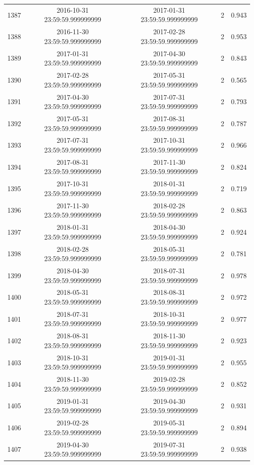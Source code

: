 \begin{table}
\begin{tabular}{lcccc}
1387 & 2016-10-31 23:59:59.999999999 & 2017-01-31 23:59:59.999999999 & 2 & 0.943 \\
1388 & 2016-11-30 23:59:59.999999999 & 2017-02-28 23:59:59.999999999 & 2 & 0.953 \\
1389 & 2017-01-31 23:59:59.999999999 & 2017-04-30 23:59:59.999999999 & 2 & 0.843 \\
1390 & 2017-02-28 23:59:59.999999999 & 2017-05-31 23:59:59.999999999 & 2 & 0.565 \\
1391 & 2017-04-30 23:59:59.999999999 & 2017-07-31 23:59:59.999999999 & 2 & 0.793 \\
1392 & 2017-05-31 23:59:59.999999999 & 2017-08-31 23:59:59.999999999 & 2 & 0.787 \\
1393 & 2017-07-31 23:59:59.999999999 & 2017-10-31 23:59:59.999999999 & 2 & 0.966 \\
1394 & 2017-08-31 23:59:59.999999999 & 2017-11-30 23:59:59.999999999 & 2 & 0.824 \\
1395 & 2017-10-31 23:59:59.999999999 & 2018-01-31 23:59:59.999999999 & 2 & 0.719 \\
1396 & 2017-11-30 23:59:59.999999999 & 2018-02-28 23:59:59.999999999 & 2 & 0.863 \\
1397 & 2018-01-31 23:59:59.999999999 & 2018-04-30 23:59:59.999999999 & 2 & 0.924 \\
1398 & 2018-02-28 23:59:59.999999999 & 2018-05-31 23:59:59.999999999 & 2 & 0.781 \\
1399 & 2018-04-30 23:59:59.999999999 & 2018-07-31 23:59:59.999999999 & 2 & 0.978 \\
1400 & 2018-05-31 23:59:59.999999999 & 2018-08-31 23:59:59.999999999 & 2 & 0.972 \\
1401 & 2018-07-31 23:59:59.999999999 & 2018-10-31 23:59:59.999999999 & 2 & 0.977 \\
1402 & 2018-08-31 23:59:59.999999999 & 2018-11-30 23:59:59.999999999 & 2 & 0.923 \\
1403 & 2018-10-31 23:59:59.999999999 & 2019-01-31 23:59:59.999999999 & 2 & 0.955 \\
1404 & 2018-11-30 23:59:59.999999999 & 2019-02-28 23:59:59.999999999 & 2 & 0.852 \\
1405 & 2019-01-31 23:59:59.999999999 & 2019-04-30 23:59:59.999999999 & 2 & 0.931 \\
1406 & 2019-02-28 23:59:59.999999999 & 2019-05-31 23:59:59.999999999 & 2 & 0.894 \\
1407 & 2019-04-30 23:59:59.999999999 & 2019-07-31 23:59:59.999999999 & 2 & 0.938 \\

\end{tabular}
\end{table}
